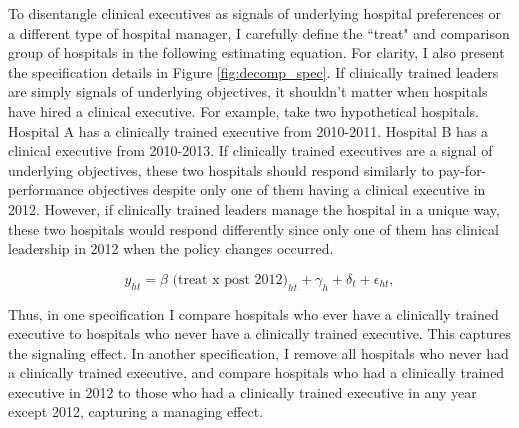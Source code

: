 \documentclass[12pt]{article}
\begin{document}
    To disentangle clinical executives as signals of underlying hospital preferences or a different type of hospital manager, I carefully define the ``treat" and comparison group of hospitals in the following estimating equation. For clarity, I also present the specification details in Figure \ref{fig:decomp_spec}. If clinically trained leaders are simply signals of underlying objectives, it shouldn't matter when hospitals have hired a clinical executive. For example, take two hypothetical hospitals. Hospital A has a clinically trained executive from 2010-2011. Hospital B has a clinical executive from 2010-2013. If clinically trained executives are a signal of underlying objectives, these two hospitals should respond similarly to pay-for-performance objectives despite only one of them having a clinical executive in 2012. However, if clinically trained leaders manage the hospital in a unique way, these two hospitals would respond differently since only one of them has clinical leadership in 2012 when the policy changes occurred. 

    \begin{equation}
    \label{eq:decomp}
    y_{ht} = \beta \text{ (treat x post 2012)}_{ht} + \gamma_{h} + \delta_t + \epsilon_{ht},
    \end{equation}

    Thus, in one specification I compare hospitals who ever have a clinically trained executive to hospitals who never have a clinically trained executive. This captures the signaling effect. In another specification, I remove all hospitals who never had a clinically trained executive, and compare hospitals who had a clinically trained executive in 2012 to those who had a clinically trained executive in any year except 2012, capturing a managing effect. 
    
\end{document}
